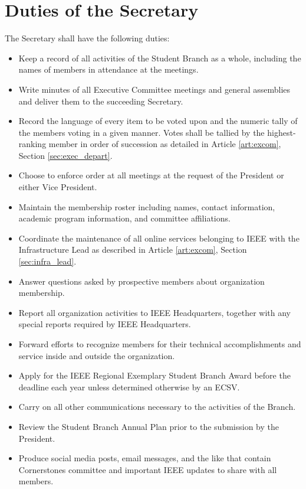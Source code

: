 \documentclass[12pt]{constitution}
\begin{document}
\section{Duties of the Secretary}
\label{sec:officer_sec}
The Secretary shall have the following duties:
\begin{itemize}
    \item Keep a record of all activities of the Student Branch as a whole, including the names of members in attendance at the meetings.
    \item Write minutes of all Executive Committee meetings and general assemblies and deliver them to the succeeding Secretary.
    \item Record the language of every item to be voted upon and the numeric tally of the members voting in a given manner. Votes shall be tallied by the highest-ranking member in order of succession as detailed in Article \ref{art:excom}, Section \ref{sec:exec_depart}. 
    \item Choose to enforce order at all meetings at the request of the President or either Vice President.
    \item Maintain the membership roster including names, contact information, academic program information, and committee affiliations.
    \item Coordinate the maintenance of all online services belonging to IEEE with the Infrastructure Lead as described in Article \ref{art:excom}, Section \ref{sec:infra_lead}.
    \item Answer questions asked by prospective members about organization membership.
    \item Report all organization activities to IEEE Headquarters, together with any special reports required by IEEE Headquarters.
    \item Forward efforts to recognize members for their technical accomplishments and service inside and outside the organization.
    \item Apply for the IEEE Regional Exemplary Student Branch Award before the deadline each year unless determined otherwise by an ECSV.
    \item Carry on all other communications necessary to the activities of the Branch. 
    \item Review the Student Branch Annual Plan prior to the submission by the President.
    \item Produce social media posts, email messages, and the like that contain Cornerstones committee and important IEEE updates to share with all members.
\end{itemize}
\end{document}
